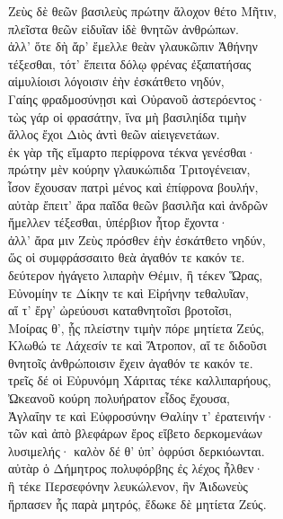 \begin{pages}
\begin{Leftside}
\quad{}Ζεὺς δὲ θεῶν βασιλεὺς πρώτην ἄλοχον θέτο Μῆτιν, \\
πλεῖστα θεῶν εἰδυῖαν ἰδὲ θνητῶν ἀνθρώπων. \\
ἀλλ' ὅτε δὴ ἄρ' ἔμελλε θεὰν γλαυκῶπιν Ἀθήνην\\
τέξεσθαι, τότ' ἔπειτα δόλῳ φρένας ἐξαπατήσας\\
αἱμυλίοισι λόγοισιν ἑὴν ἐσκάτθετο νηδύν,  \\
Γαίης φραδμοσύνῃσι καὶ Οὐρανοῦ ἀστερόεντος· \\
τὼς γάρ οἱ φρασάτην, ἵνα μὴ βασιληίδα τιμὴν\\
ἄλλος ἔχοι Διὸς ἀντὶ θεῶν αἰειγενετάων.\\
ἐκ γὰρ τῆς εἵμαρτο περίφρονα τέκνα γενέσθαι· \\
πρώτην μὲν κούρην γλαυκώπιδα Τριτογένειαν, \\
ἶσον ἔχουσαν πατρὶ μένος καὶ ἐπίφρονα βουλήν,\\
αὐτὰρ ἔπειτ' ἄρα παῖδα θεῶν βασιλῆα καὶ ἀνδρῶν\\
ἤμελλεν τέξεσθαι, ὑπέρβιον ἦτορ ἔχοντα·\\
ἀλλ' ἄρα μιν Ζεὺς πρόσθεν ἑὴν ἐσκάτθετο νηδύν,\\
ὥς οἱ συμφράσσαιτο θεὰ ἀγαθόν τε κακόν τε. \\

\quad{}δεύτερον ἠγάγετο λιπαρὴν Θέμιν, ἣ τέκεν Ὥρας,\\
Εὐνομίην τε Δίκην τε καὶ Εἰρήνην τεθαλυῖαν,\\
αἵ τ' ἔργ' ὠρεύουσι καταθνητοῖσι βροτοῖσι,\\
Μοίρας θ', ᾗς πλείστην τιμὴν πόρε μητίετα Ζεύς, \\
Κλωθώ τε Λάχεσίν τε καὶ Ἄτροπον, αἵ τε διδοῦσι  \\
θνητοῖς ἀνθρώποισιν ἔχειν ἀγαθόν τε κακόν τε.\\

\quad{}τρεῖς δέ οἱ Εὐρυνόμη Χάριτας τέκε καλλιπαρήους,\\
Ὠκεανοῦ κούρη πολυήρατον εἶδος ἔχουσα,\\
Ἀγλαΐην τε καὶ Εὐφροσύνην Θαλίην τ' ἐρατεινήν·\\
τῶν καὶ ἀπὸ βλεφάρων ἔρος εἴβετο δερκομενάων \\
λυσιμελής· καλὸν δέ θ' ὑπ' ὀφρύσι δερκιόωνται. \\

\quad{}αὐτὰρ ὁ Δήμητρος πολυφόρβης ἐς λέχος ἦλθεν· \\
ἣ τέκε Περσεφόνην λευκώλενον, ἣν Ἀιδωνεὺς\\
ἥρπασεν ἧς παρὰ μητρός, ἔδωκε δὲ μητίετα Ζεύς. \\


\end{Leftside}
\end{pages}
